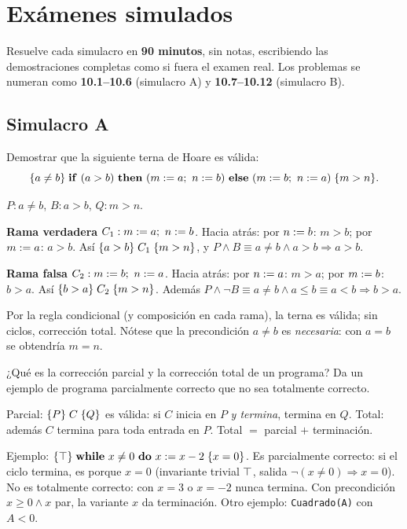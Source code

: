 \newpage
\section{Exámenes simulados}
Resuelve cada simulacro en \textbf{90 minutos}, sin notas, escribiendo las demostraciones completas como si fuera el examen real. Los problemas se numeran como \textbf{10.1--10.6} (simulacro A) y \textbf{10.7--10.12} (simulacro B).

\subsection*{Simulacro A}

\begin{prob}[ · A1]
Demostrar que la siguiente terna de Hoare es válida:
\[\hoare{a\neq b}{\kw{if}\ (a>b)\ \kw{then}\ (m\asg a;\ n\asg b)\ \kw{else}\ (m\asg b;\ n\asg a)}{m>n}.\]
\end{prob}
\begin{sol}
$P: a\ne b$, $B: a>b$, $Q: m>n$.

\textbf{Rama verdadera} $C_1: m\mathrel{:=} a;\ n\mathrel{:=} b$. Hacia atrás: por $n\mathrel{:=} b$: $m>b$; por $m\mathrel{:=} a$: $a>b$. Así $\{a>b\}\;C_1\;\{m>n\}$, y $P\land B\equiv a\ne b\land a>b\Rightarrow a>b$. \checkmark

\textbf{Rama falsa} $C_2: m\asg b;\ n\asg a$. Hacia atrás: por $n\mathrel{:=} a$: $m>a$; por $m\mathrel{:=} b$: $b>a$. Así $\{b>a\}\;C_2\;\{m>n\}$. Además $P\land\neg B\equiv a\ne b\land a\le b\equiv a<b\Rightarrow b>a$. \checkmark

Por la regla condicional (y composición en cada rama), la terna es válida; sin ciclos, corrección total. Nótese que la precondición $a\ne b$ es \emph{necesaria}: con $a=b$ se obtendría $m=n$.
\end{sol}

\begin{prob}[ · A2]
¿Qué es la corrección parcial y la corrección total de un programa? Da un ejemplo de programa parcialmente correcto que no sea totalmente correcto.
\end{prob}
\begin{sol}
Parcial: $\{P\}\;C\;\{Q\}$ es válida: si $C$ inicia en $P$ \emph{y termina}, termina en $Q$. Total: además $C$ termina para toda entrada en $P$. Total $=$ parcial $+$ terminación.

Ejemplo: $\hoare{\T}{\kw{while}\ x\ne0\ \kw{do}\ x\asg x-2}{x=0}$. Es parcialmente correcto: si el ciclo termina, es porque $x=0$ (invariante trivial $\top$, salida $\neg(x\ne0)\Rightarrow x=0$). No es totalmente correcto: con $x=3$ o $x=-2$ nunca termina. Con precondición $x\ge0\land x$ par, la variante $x$ da terminación. Otro ejemplo: \texttt{Cuadrado(A)} con $A<0$.
\end{sol}

